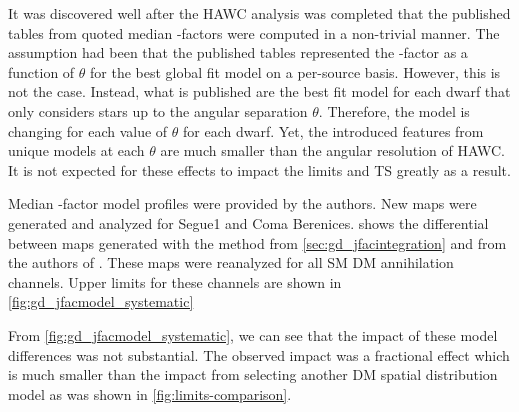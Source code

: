It was discovered well after the HAWC analysis was completed that the published tables from \GS \cite{Geringer_Sameth_2015} quoted median \J-factors were computed in a non-trivial manner.
The assumption had been that the published tables represented the \J-factor as a function of $\theta$ for the best global fit model on a per-source basis.
However, this is not the case.
Instead, what is published are the best fit model for each dwarf that only considers stars up to the angular separation $\theta$.
Therefore, the model is changing for each value of $\theta$ for each dwarf.
Yet, the introduced features from unique models at each $\theta$ are much smaller than the angular resolution of HAWC.
It is not expected for these effects to impact the limits and TS greatly as a result.

Median \J-factor model profiles were provided by the authors.
New maps were generated and analyzed for Segue1 and Coma Berenices.
 shows the differential between maps generated with the method from \cref{sec:gd_jfacintegration} and from the authors of \cite{Geringer_Sameth_2015}.
These maps were reanalyzed for all SM DM annihilation channels.
Upper limits for these channels are shown in \cref{fig:gd_jfacmodel_systematic}

From \cref{fig:gd_jfacmodel_systematic}, we can see that the impact of these model differences was not substantial.
The observed impact was a fractional effect which is much smaller than the impact from selecting another DM spatial distribution model as was shown in \cref{fig:limits-comparison}.

